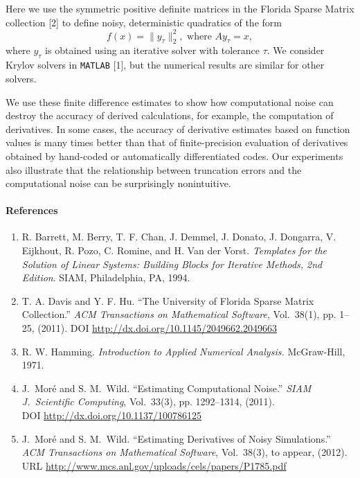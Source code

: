 \documentclass{report}
\begin{document}
Here we use the symmetric positive definite matrices
in the Florida Sparse Matrix collection
[2]
to
define noisy, deterministic quadratics of the form
\begin{equation*}
f(x) = \|y_{\tau}\|_2^2, \mbox{ where } Ay_{\tau}=x,
\end{equation*}
where $y_{\tau}$ is obtained using an iterative solver with tolerance
$\tau$.
We consider Krylov solvers in \texttt{MATLAB}
[1],
but the
numerical results are similar for other solvers.

We use these finite difference estimates to show how computational
noise can destroy the accuracy of derived calculations, for example, the
computation of derivatives.
In some cases, the accuracy of derivative estimates based on function
values is many times better than that of finite-precision evaluation of
derivatives obtained by hand-coded or automatically differentiated codes.
Our experiments also illustrate that the relationship between
truncation errors and the computational noise can be surprisingly
nonintuitive.

\paragraph{References}
\begin{enumerate}
\item[{[1]}] R. Barrett, M. Berry, T. F. Chan, J. Demmel, J.
Donato, J. Dongarra, V. Eijkhout, R. Pozo, C. Romine, and H. Van der Vorst.
{\em Templates for the Solution of Linear Systems: Building Blocks for
Iterative Methods, 2nd Edition}. SIAM, Philadelphia, PA, 1994.

\item[{[2]}] T. A. Davis and Y. F. Hu.
``The University of Florida Sparse Matrix Collection.''
\textit{ACM Transactions on Mathematical Software}, Vol.~38(1), pp.
1--25, (2011).
DOI \url{http://dx.doi.org/10.1145/2049662.2049663}

\item[{[3]}] R. W. Hamming. {\em Introduction to Applied
Numerical Analysis.} McGraw-Hill, 1971.

\item[{[4]}]
J.~Mor\'e and S. M.~Wild.
``Estimating Computational Noise.''
{\em SIAM J.~Scientific Computing}, Vol.~33(3), pp. 1292--1314, (2011). \\
DOI \url{http://dx.doi.org/10.1137/100786125}

\item[{[5]}]
J.~Mor\'e and S. M.~Wild.
``Estimating Derivatives of Noisy Simulations.''
\textit{ACM Transactions on Mathematical Software}, Vol.~38(3), to
appear, (2012).
URL \url{http://www.mcs.anl.gov/uploads/cels/papers/P1785.pdf}
\end{enumerate}
\end{document}
